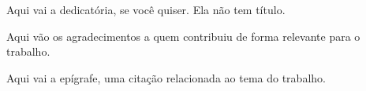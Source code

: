 \documentclass[12pt,a4paper,oneside]{article}
\begin{document}
\imprimircapa          %

\imprimirfolhaderosto  %
\imprimirficha         %


\begin{folhadeaprovacao}
\end{folhadeaprovacao}

\begin{dedicatoria}
  Aqui vai a dedicatória, se você quiser. Ela não tem título.
\end{dedicatoria}

\begin{agradecimentos}
  Aqui vão os agradecimentos a quem contribuiu de forma relevante para o trabalho.
\end{agradecimentos}

\begin{epigrafe}
  Aqui vai a epígrafe, uma citação relacionada ao tema do trabalho.
\end{epigrafe}
\end{document}
